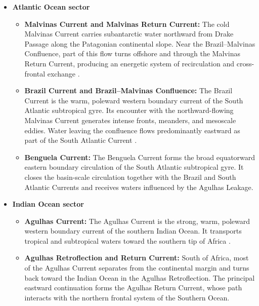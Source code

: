 \documentclass[
  draft
]{agujournal2025}
\begin{document}
\begin{itemize}
        
            \item \textbf{Atlantic Ocean sector}
            \begin{itemize}
        
                \item \textbf{Malvinas Current and Malvinas Return Current:}
                The cold Malvinas Current carries subantarctic water northward from Drake Passage along the Patagonian continental slope. Near the Brazil--Malvinas Confluence, part of this flow turns offshore and  through the Malvinas Return Current, producing an energetic system of recirculation and cross-frontal exchange \cite{art:artana2021}.
        
                \item \textbf{Brazil Current and Brazil--Malvinas Confluence:}
                The Brazil Current is the warm, poleward western boundary current of the South Atlantic subtropical gyre. Its encounter with the northward-flowing Malvinas Current generates intense fronts, meanders, and mesoscale eddies. Water leaving the confluence flows predominantly eastward as part of the South Atlantic Current \cite{art:goni2011,art:orueechevarria2019a}.
                
                \item \textbf{Benguela Current:}
                The Benguela Current forms the broad equatorward eastern boundary circulation of the South Atlantic subtropical gyre. It closes the basin-scale circulation together with the Brazil and South Atlantic Currents and receives waters influenced by the Agulhas Leakage.
        
            \end{itemize}
        
        
            \item \textbf{Indian Ocean sector}
            \begin{itemize}
        
                \item \textbf{Agulhas Current:}
                The Agulhas Current is the strong, warm, poleward western boundary current of the southern Indian Ocean. It transports tropical and subtropical waters toward the southern tip of Africa \cite{art:beal2011}.
        
                \item \textbf{Agulhas Retroflection and Return Current:}
                South of Africa, most of the Agulhas Current separates from the continental margin and turns back toward the Indian Ocean in the Agulhas Retroflection. The principal eastward continuation forms the Agulhas Return Current, whose path interacts with the northern frontal system of the Southern Ocean.
        

\end{itemize}
\end{itemize}
\end{document}
